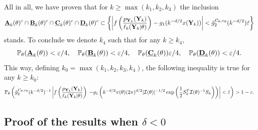 \begin{proofb}
All in all, we have proven that for $k\geq\max(k_1,k_2,k_3)$ the inclusion
    \begin{equation}
         \underline{\mathbf{A}}_k(\theta)^c\cap \underline{\mathbf{B}}_k(\theta)^c\cap \underline{\mathbf{C}}_k(\theta)^c\cap \underline{\mathbf{D}}_k(\theta)^c \subset \left\{ \left|f\left(\frac{p_{\mathbf{Y}_k}(\mathbf{Y}_k)}{\ell_k(\mathbf{Y}_k|\theta)} \right) - g_1(k^{-d/2} x(\mathbf{Y}_k)) \right| < \tilde g_2^{C_\theta,c_\theta}(k^{-d/2}) \tilde{\varepsilon}  \right\}
    \end{equation}
stands.
To conclude we denote $k_4$ such that for any $k\geq k_4$,
        \begin{equation}
            \mathbb{P}_\theta(\underline{\mathbf{A}}_k(\theta)) <\varepsilon/4,\quad\mathbb{P}_\theta(\underline{\mathbf{B}}_k(\theta))<\varepsilon/4, \quad\mathbb{P}_\theta(\underline{\mathbf{C}}_k(\theta))\varepsilon/4, \quad \mathbb{P}_\theta(\underline{\mathbf{D}}_k(\theta))<\varepsilon/4.
        \end{equation}
This way, defining $k_0=\max(k_1,k_2,k_3,k_4)$, the following inequality is true for any $k\geq k_0$:
\begin{equation}
    \mathbb{P}_\theta\left(\tilde g_2^{C_\theta,c_\theta}(k^{-d/2})^{-1}\left| f\left(\frac{p_{\mathbf{Y}_k}(\mathbf{Y}_k)}{\ell_k(\mathbf{Y}_k|\theta)}\right) \right.            \left. - g_1\left(k^{-d/2}\pi(\theta)(2\pi)^{d/2}|\mathcal{I}(\theta)|^{-1/2}\exp\left(\frac{1}{2}S_k^T\mathcal{I}(\theta)^{-1}S_k \right)\right) \right|<\tilde{\varepsilon}   \right)>1-\varepsilon.
\end{equation}
\end{proofb}


\newcommand{\ubf}[1]{\underline{\mbf{#1}}}


\subsection{Proof of the results when $\delta<0$} %

